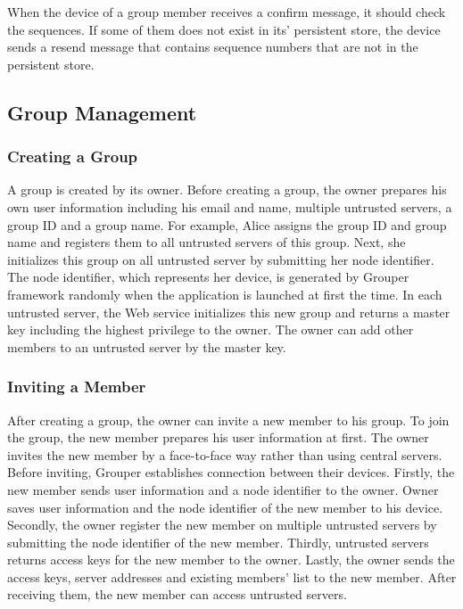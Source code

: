 \documentclass[twocolumn,10pt]{article}
\begin{document}
When the device of a group member receives a confirm message, it should check the sequences. If some of them does not exist in its' persistent store, the device sends a resend message that contains sequence numbers that are not in the persistent store.

\subsection{Group Management}

\subsubsection{Creating a Group}

A group is created by its owner. Before creating a group, the owner prepares his own user information including his email and name, multiple untrusted servers, a group ID and a group name. For example, Alice assigns the group ID and group name and registers them to all untrusted servers of this group. Next, she initializes this group on all untrusted server by submitting her node identifier. The node identifier, which represents her device, is generated by Grouper framework randomly when the application is launched at first the time. In each untrusted server, the Web service initializes this new group and returns a master key including the highest privilege to the owner. The owner can add other members to an untrusted server by the master key.

\subsubsection{Inviting a Member}

After creating a group, the owner can invite a new member to his group. To join the group, the new member prepares his user information at first. The owner invites the new member by a face-to-face way rather than using central servers. Before inviting, Grouper establishes connection between their devices. Firstly, the new member sends user information and a node identifier to the owner. Owner saves user information and the node identifier of the new member to his device. Secondly, the owner register the new member on multiple untrusted servers by submitting the node identifier of the new member. Thirdly, untrusted servers returns access keys for the new member to the owner. Lastly, the owner sends the access keys, server addresses and existing members' list to the new member. After receiving them, the new member can access untrusted servers.
\end{document}
